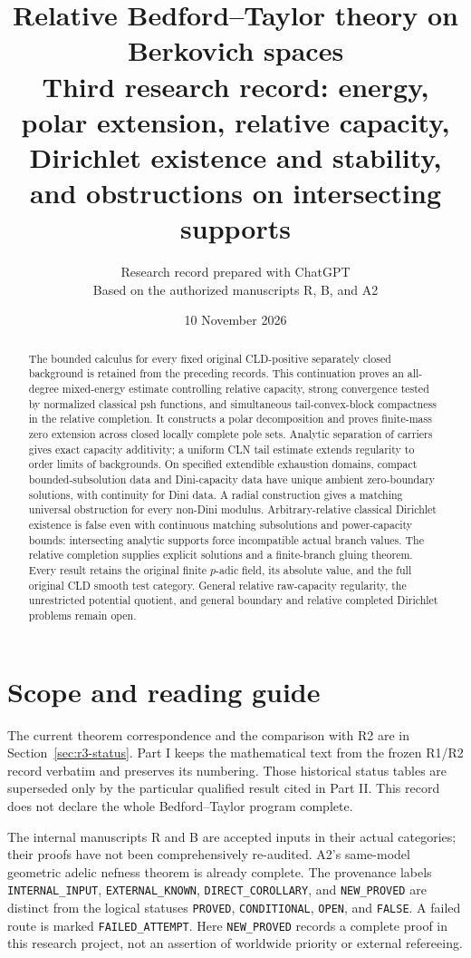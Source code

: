 \documentclass[11pt,a4paper]{article}
\title{Relative Bedford--Taylor theory on Berkovich spaces\\[5pt]
\large Third research record: energy, polar extension, relative capacity,\\
Dirichlet existence and stability, and obstructions on intersecting supports}
\author{Research record prepared with ChatGPT\\
\small Based on the authorized manuscripts R, B, and A2}
\date{10 November 2026}
\numberwithin{equation}{section}
\theoremstyle{definition}
\theoremstyle{remark}
\begin{document}
\maketitle
\begin{abstract}
The bounded calculus for every fixed original CLD-positive separately
closed background is retained from the preceding records. This continuation
proves an all-degree mixed-energy estimate controlling relative capacity,
strong convergence tested by normalized classical psh functions, and
simultaneous tail-convex-block compactness in the relative completion.
It constructs a polar decomposition and proves finite-mass zero extension
across closed locally complete pole sets. Analytic separation of carriers
gives exact capacity additivity; a uniform CLN tail estimate extends
regularity to order limits of backgrounds. On specified extendible
exhaustion domains, compact bounded-subsolution data and Dini-capacity data
have unique ambient zero-boundary solutions, with continuity for Dini data.
A radial construction gives a matching universal obstruction for every
non-Dini modulus. Arbitrary-relative classical Dirichlet existence is
false even with continuous matching subsolutions and power-capacity bounds:
intersecting analytic supports force incompatible actual branch values.
The relative completion supplies explicit solutions and a finite-branch
gluing theorem. Every result retains the original finite $p$-adic field,
its absolute value, and the full original CLD smooth test category.
General relative raw-capacity regularity, the unrestricted potential
quotient, and general boundary and relative completed Dirichlet problems
remain open.
\end{abstract}

\section*{Scope and reading guide}
The current theorem correspondence and the comparison with R2 are in
Section~\ref{sec:r3-status}. Part I keeps the mathematical text
from the frozen R1/R2 record verbatim and preserves its numbering.
Those historical status tables are superseded only by the particular
qualified result cited in Part II. This record does not declare the
whole Bedford--Taylor program complete.

The internal manuscripts R and B are accepted inputs in their actual
categories; their proofs have not been comprehensively re-audited.
A2's same-model geometric adelic nefness theorem is already complete.
The provenance labels \texttt{INTERNAL\_INPUT},
\texttt{EXTERNAL\_KNOWN}, \texttt{DIRECT\_COROLLARY}, and
\texttt{NEW\_PROVED} are distinct from the logical statuses
\texttt{PROVED}, \texttt{CONDITIONAL}, \texttt{OPEN}, and
\texttt{FALSE}. A failed route is marked \texttt{FAILED\_ATTEMPT}.
Here \texttt{NEW\_PROVED} records a complete proof in this research
project, not an assertion of worldwide priority or external refereeing.
\end{document}

